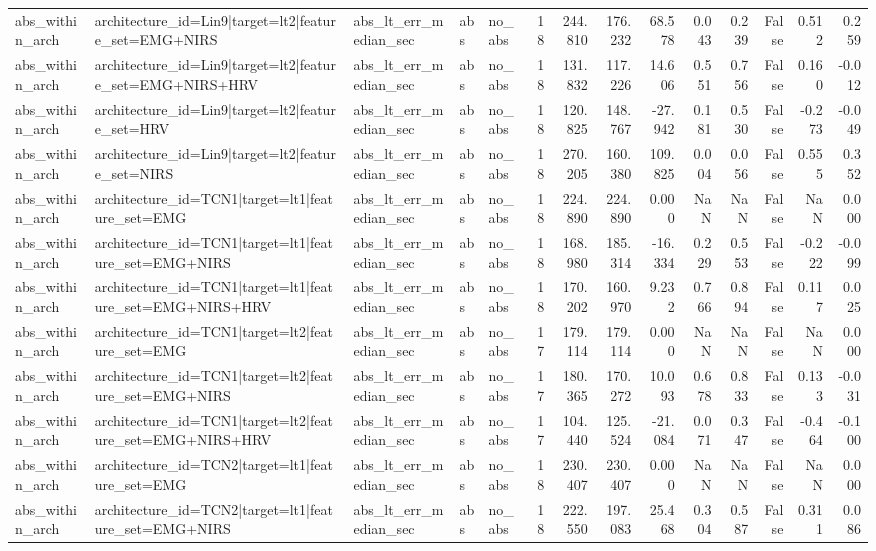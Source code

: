 \begin{table}
\begin{tabular}{lllllrrrrrrrrr}
abs_within_arch & architecture_id=Lin9|target=lt2|feature_set=EMG+NIRS & abs_lt_err_median_sec & abs & no_abs & 18 & 244.810 & 176.232 & 68.578 & 0.043 & 0.239 & False & 0.512 & 0.259 \\
abs_within_arch & architecture_id=Lin9|target=lt2|feature_set=EMG+NIRS+HRV & abs_lt_err_median_sec & abs & no_abs & 18 & 131.832 & 117.226 & 14.606 & 0.551 & 0.756 & False & 0.160 & -0.012 \\
abs_within_arch & architecture_id=Lin9|target=lt2|feature_set=HRV & abs_lt_err_median_sec & abs & no_abs & 18 & 120.825 & 148.767 & -27.942 & 0.181 & 0.530 & False & -0.273 & -0.049 \\
abs_within_arch & architecture_id=Lin9|target=lt2|feature_set=NIRS & abs_lt_err_median_sec & abs & no_abs & 18 & 270.205 & 160.380 & 109.825 & 0.004 & 0.056 & False & 0.555 & 0.352 \\
abs_within_arch & architecture_id=TCN1|target=lt1|feature_set=EMG & abs_lt_err_median_sec & abs & no_abs & 18 & 224.890 & 224.890 & 0.000 & NaN & NaN & False & NaN & 0.000 \\
abs_within_arch & architecture_id=TCN1|target=lt1|feature_set=EMG+NIRS & abs_lt_err_median_sec & abs & no_abs & 18 & 168.980 & 185.314 & -16.334 & 0.229 & 0.553 & False & -0.222 & -0.099 \\
abs_within_arch & architecture_id=TCN1|target=lt1|feature_set=EMG+NIRS+HRV & abs_lt_err_median_sec & abs & no_abs & 18 & 170.202 & 160.970 & 9.232 & 0.766 & 0.894 & False & 0.117 & 0.025 \\
abs_within_arch & architecture_id=TCN1|target=lt2|feature_set=EMG & abs_lt_err_median_sec & abs & no_abs & 17 & 179.114 & 179.114 & 0.000 & NaN & NaN & False & NaN & 0.000 \\
abs_within_arch & architecture_id=TCN1|target=lt2|feature_set=EMG+NIRS & abs_lt_err_median_sec & abs & no_abs & 17 & 180.365 & 170.272 & 10.093 & 0.678 & 0.833 & False & 0.133 & -0.031 \\
abs_within_arch & architecture_id=TCN1|target=lt2|feature_set=EMG+NIRS+HRV & abs_lt_err_median_sec & abs & no_abs & 17 & 104.440 & 125.524 & -21.084 & 0.071 & 0.347 & False & -0.464 & -0.100 \\
abs_within_arch & architecture_id=TCN2|target=lt1|feature_set=EMG & abs_lt_err_median_sec & abs & no_abs & 18 & 230.407 & 230.407 & 0.000 & NaN & NaN & False & NaN & 0.000 \\
abs_within_arch & architecture_id=TCN2|target=lt1|feature_set=EMG+NIRS & abs_lt_err_median_sec & abs & no_abs & 18 & 222.550 & 197.083 & 25.468 & 0.304 & 0.587 & False & 0.311 & 0.086 \\

\end{tabular}
\end{table}
